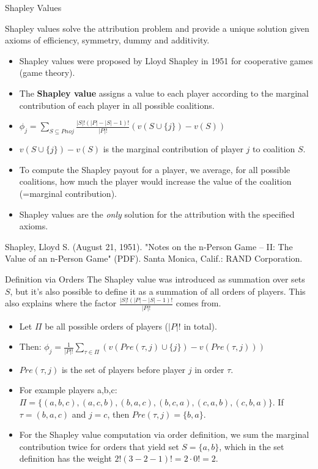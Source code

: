 \documentclass[aspectratio=169]{../latex_main/tntbeamer}  %
\begin{document}
\begin{frame}{Shapley Values}

  Shapley values solve the attribution problem and provide a unique solution given axioms of efficiency, symmetry, dummy and additivity.
\begin{itemize}
  \item Shapley values were proposed by Lloyd Shapley in 1951 for cooperative games (game theory).
  \item The \textbf{Shapley value} assigns a value to each player according to the marginal contribution of each player in all possible coalitions.
  \pause
  \smallskip
  \item $\phi_j = \sum_{S \subseteq Pnoj} \frac{|S|!(|P| - |S| - 1)!}{|P|!}(v(S \cup \{j\}) - v(S))$
  \item $v(S \cup \{j\}) - v(S)$ is the marginal contribution of player $j$ to coalition $S$.
  \pause
  \smallskip
  \item To compute the Shapley payout for a player, we average, for all possible coalitions, how much the player would increase the value of the coalition (=marginal contribution).
  \item Shapley values are the \textit{only} solution for the attribution with the specified axioms.
\end{itemize}

\vfill
\tiny{ Shapley, Lloyd S. (August 21, 1951). "Notes on the n-Person Game -- II: The Value of an n-Person Game" (PDF). Santa Monica, Calif.: RAND Corporation.}

\end{frame}

\begin{frame}{Definition via Orders}
The Shapley value was introduced as summation over sets $S$, but it's also possible to define it as a summation of all orders of players.
This also explains where the factor $\frac{|S|!(|P| - |S| - 1)!}{|P|!}$ comes from.
\begin{itemize}
  \item Let $\Pi$ be all possible orders of players ($|P|!$ in total).
  \item Then: $\phi_j = \frac{1}{|P|!} \sum_{\tau \in \Pi} (v(Pre(\tau,j) \cup \{j\}) - v(Pre(\tau,j)))$
  \item $Pre(\tau,j)$ is the set of players before player $j$ in order $\tau$.
  \pause
  \item For example players a,b,c: $\Pi = \{(a,b,c), (a,c,b), (b,a,c), (b,c,a), (c,a,b), (c,b,a)\}$. If $\tau = (b,a,c)$ and $j=c$, then $Pre(\tau,j) = \{b, a\}$.
  \pause
  \item For the Shapley value computation via order definition, we sum the marginal contribution twice for orders that yield set $S = \{a,b\}$, which in the set definition has the weight $2! (3 - 2 - 1)! = 2 \cdot 0! = 2$.
\end{itemize}

\end{frame}
\end{document}
